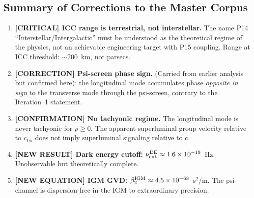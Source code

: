 \documentclass[11pt]{article}
\newcommand{\ee}[1]{\times 10^{#1}}
\newcommand{\cfield}{c_{1\mathrm{w}}}
\begin{document}
\subsection*{Summary of Corrections to the Master Corpus}

\begin{enumerate}
\item \textbf{[CRITICAL] ICC range is terrestrial, not interstellar.}
  The name P14 ``Interstellar/Intergalactic'' must be understood as
  the theoretical regime of the physics, not an achievable engineering
  target with P15 coupling. Range at ICC threshold: $\sim 200$~km,
  not parsecs.

\item \textbf{[CORRECTION] Psi-screen phase sign.} (Carried from earlier
  analysis but confirmed here): the longitudinal mode accumulates phase
  \textit{opposite in sign} to the transverse mode through the psi-screen,
  contrary to the Iteration~1 statement.

\item \textbf{[CONFIRMATION] No tachyonic regime.} The longitudinal mode
  is never tachyonic for $\rho \geq 0$. The apparent superluminal
  group velocity relative to $\cfield$ does not imply superluminal
  signaling relative to $c$.

\item \textbf{[NEW RESULT] Dark energy cutoff:} $\nu_{\rm cut}^{\rm DE}
  \approx 1.6\ee{-19}$~Hz. Unobservable but theoretically complete.

\item \textbf{[NEW EQUATION] IGM GVD:}
  $\beta_2^{\rm IGM} \approx 4.5\ee{-68}$~s$^2$/m.
  The psi-channel is dispersion-free in the IGM to extraordinary precision.
\end{enumerate}
\end{document}
